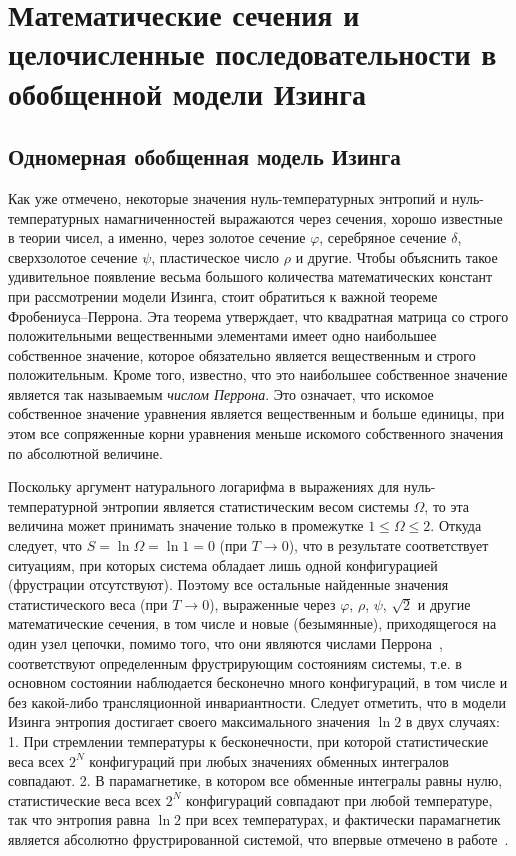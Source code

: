 \chapter{Математические сечения и целочисленные последовательности в обобщенной модели Изинга}\label{ch:ch5}

\section{Одномерная обобщенная модель Изинга}

Как уже отмечено, некоторые значения нуль-температурных энтропий и нуль-температурных намагниченностей выражаются через сечения, хорошо известные в теории чисел, а именно, через золотое сечение $\varphi$, серебряное сечение $\delta$, сверхзолотое сечение $\psi$, пластическое число $\rho$ и другие. Чтобы объяснить такое удивительное появление весьма большого количества математических констант при рассмотрении модели Изинга, стоит обратиться к важной теореме Фробениуса--Перрона. Эта теорема утверждает, что квадратная матрица со строго положительными вещественными элементами имеет одно наибольшее собственное значение, которое обязательно является вещественным и строго положительным. Кроме того, известно, что это наибольшее собственное значение является так называемым \emph{числом Перрона}. Это означает, что искомое собственное значение уравнения является вещественным и больше единицы, при этом все сопряженные корни уравнения меньше искомого собственного значения по абсолютной величине. 

Поскольку аргумент натурального логарифма в выражениях для нуль-температурной энтропии является статистическим весом системы $\Omega$, то эта величина может принимать значение только в промежутке $1\leqslant \Omega\leqslant 2$. Откуда следует, что $S= \ln \Omega =  \ln 1 = 0$ (при $T \rightarrow 0$), что в результате соответствует ситуациям, при которых система обладает лишь одной конфигурацией (фрустрации отсутствуют). Поэтому все остальные найденные значения статистического веса (при $T \rightarrow 0$), выраженные через $\varphi$, $\rho$, $\psi$,  $\sqrt{2}$ и другие математические сечения, в том числе и новые (безымянные), приходящегося на один узел цепочки, помимо того, что они являются числами Перрона~\cite{wu2010, lind1992, boyd1985}, соответствуют определенным фрустрирующим состояниям системы, т.е. в основном состоянии наблюдается бесконечно много конфигураций, в том числе и без какой-либо трансляционной инвариантности. Следует отметить, что в модели Изинга энтропия достигает своего максимального значения $\ln 2$ в двух случаях: 1. При стремлении температуры к бесконечности, при которой статистические веса всех $2^N$ конфигураций при любых значениях обменных интегралов совпадают. 2. В парамагнетике, в котором все обменные интегралы равны нулю, статистические веса всех $2^N$ конфигураций совпадают при любой температуре, так что энтропия равна $\ln 2$ при всех температурах, и фактически парамагнетик является абсолютно фрустрированной системой, что впервые отмечено в работе~\cite{zarubin2019}. 

